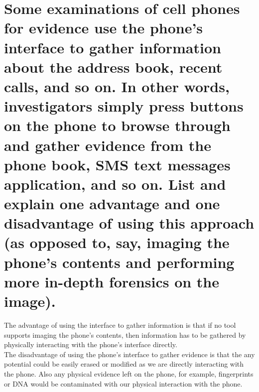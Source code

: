 \documentclass[12pt]{article}
\begin{document}
\section{Some examinations of cell phones for evidence use the phone's interface to gather information about the address book, recent calls, and so on. In other words, investigators simply press buttons on the phone to browse through and gather evidence from the phone book, SMS text messages application, and so on. List and explain one advantage and one disadvantage of using this approach (as opposed to, say, imaging the phone's contents and performing more in-depth forensics on the image).}
The advantage of using the interface to gather information is that if no tool supports imaging the phone's contents, then information has to be gathered by physically interacting with the phone's interface directly.\\
The disadvantage of using the phone's interface to gather evidence is that the any potential could be easily erased or modified as we are directly interacting with the phone. Also any physical evidence left on the phone, for example, fingerprints or DNA would be contaminated with our physical interaction with the phone.
\end{document}

